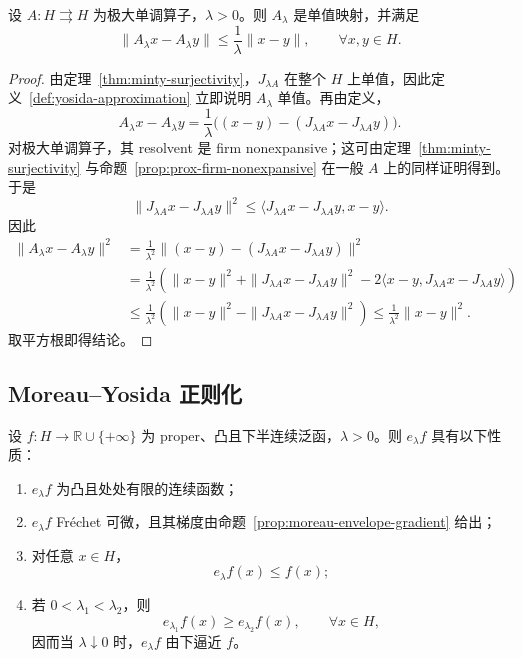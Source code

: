 \begin{proposition}\label{prop:yosida-lipschitz}
设 $A\colon H\rightrightarrows H$ 为极大单调算子，$\lambda>0$。则 $A_\lambda$ 是单值映射，并满足
\[
\|A_\lambda x-A_\lambda y\|
\le
\frac{1}{\lambda}\|x-y\|,
\qquad \forall x,y\in H.
\]
\end{proposition}

\begin{proof}
由定理~\ref{thm:minty-surjectivity}，$J_{\lambda A}$ 在整个 $H$ 上单值，因此定义~\ref{def:yosida-approximation} 立即说明 $A_\lambda$ 单值。再由定义，
\[
A_\lambda x-A_\lambda y
=
\frac{1}{\lambda}\bigl((x-y)-(J_{\lambda A}x-J_{\lambda A}y)\bigr).
\]
对极大单调算子，其 resolvent 是 firm nonexpansive；这可由定理~\ref{thm:minty-surjectivity} 与命题~\ref{prop:prox-firm-nonexpansive} 在一般 $A$ 上的同样证明得到。于是
\[
\|J_{\lambda A}x-J_{\lambda A}y\|^2
\le
\langle J_{\lambda A}x-J_{\lambda A}y,x-y\rangle.
\]
因此
\[
\begin{aligned}
\|A_\lambda x-A_\lambda y\|^2
&=
\frac{1}{\lambda^2}
\|(x-y)-(J_{\lambda A}x-J_{\lambda A}y)\|^2 \\
&=
\frac{1}{\lambda^2}
\left(
\|x-y\|^2+\|J_{\lambda A}x-J_{\lambda A}y\|^2
-2\langle x-y,J_{\lambda A}x-J_{\lambda A}y\rangle
\right) \\
&\le
\frac{1}{\lambda^2}
\left(
\|x-y\|^2-\|J_{\lambda A}x-J_{\lambda A}y\|^2
\right)
\le
\frac{1}{\lambda^2}\|x-y\|^2.
\end{aligned}
\]
取平方根即得结论。
\end{proof}

\subsection{Moreau--Yosida 正则化}

\begin{theorem}\label{thm:moreau-yosida-regularization}
设 $f\colon H\to \mathbb R\cup\{+\infty\}$ 为 proper、凸且下半连续泛函，$\lambda>0$。则 $e_\lambda f$ 具有以下性质：
\begin{enumerate}
  \item $e_\lambda f$ 为凸且处处有限的连续函数；
  \item $e_\lambda f$ Fr\'echet 可微，且其梯度由命题~\ref{prop:moreau-envelope-gradient} 给出；
  \item 对任意 $x\in H$，
  \[
  e_\lambda f(x)\le f(x);
  \]
  \item 若 $0<\lambda_1<\lambda_2$，则
  \[
  e_{\lambda_1}f(x)\ge e_{\lambda_2}f(x),\qquad \forall x\in H,
  \]
  因而当 $\lambda\downarrow 0$ 时，$e_\lambda f$ 由下逼近 $f$。
\end{enumerate}
\end{theorem}

